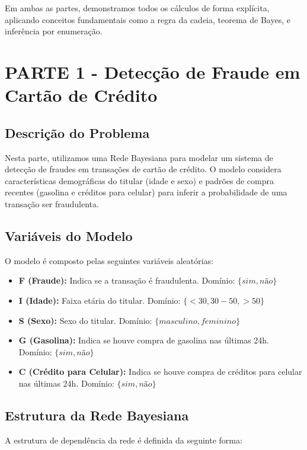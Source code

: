 \documentclass[a4paper,12pt]{article}
\begin{document}
Em ambas as partes, demonstramos todos os cálculos de forma explícita, aplicando conceitos fundamentais como a regra da cadeia, teorema de Bayes, e inferência por enumeração.

\section{PARTE 1 - Detecção de Fraude em Cartão de Crédito}
\label{sec:parte1}

\subsection{Descrição do Problema}

Nesta parte, utilizamos uma Rede Bayesiana para modelar um sistema de detecção de fraudes em transações de cartão de crédito. O modelo considera características demográficas do titular (idade e sexo) e padrões de compra recentes (gasolina e créditos para celular) para inferir a probabilidade de uma transação ser fraudulenta.

\subsection{Variáveis do Modelo}

O modelo é composto pelas seguintes variáveis aleatórias:

\begin{itemize}
    \item \textbf{F (Fraude):} Indica se a transação é fraudulenta. Domínio: $\{sim, não\}$
    \item \textbf{I (Idade):} Faixa etária do titular. Domínio: $\{<30, 30-50, >50\}$
    \item \textbf{S (Sexo):} Sexo do titular. Domínio: $\{masculino, feminino\}$
    \item \textbf{G (Gasolina):} Indica se houve compra de gasolina nas últimas 24h. Domínio: $\{sim, não\}$
    \item \textbf{C (Crédito para Celular):} Indica se houve compra de créditos para celular nas últimas 24h. Domínio: $\{sim, não\}$
\end{itemize}

\subsection{Estrutura da Rede Bayesiana}

A estrutura de dependência da rede é definida da seguinte forma:
\end{document}
